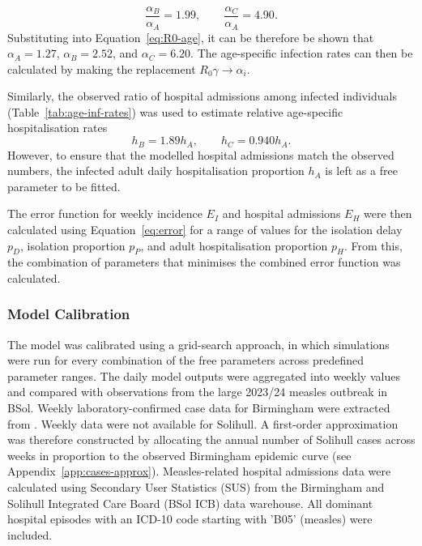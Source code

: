 \documentclass[12pt]{article}
\begin{document}
\begin{equation}
    \label{eq:inf-rates}
    \frac{\alpha_B}{\alpha_A} = 1.99,
    \qquad 
    \frac{\alpha_C}{\alpha_A} = 4.90.
\end{equation}
%
Substituting into Equation~\ref{eq:R0-age}, it can be therefore be shown that $\alpha_A = 1.27$, $\alpha_B = 2.52$, and $\alpha_C = 6.20$. The age-specific infection rates can then be calculated by making the replacement $R_0 \gamma \rightarrow \alpha_i$.

Similarly, the observed ratio of hospital admissions among infected individuals (Table~\ref{tab:age-inf-rates}) was used to estimate relative age-specific hospitalisation rates
%
\begin{equation}
    \label{eq:hosp-rates}
    h_B = 1.89 h_A,
    \qquad 
    h_C = 0.940h_A.
\end{equation}
%
However, to ensure that the modelled hospital admissions match the observed numbers, the infected adult daily hospitalisation proportion $h_A$ is left as a free parameter to be fitted.

The error function for weekly incidence $E_I$ and hospital admissions $E_H$ were then calculated using Equation~\ref{eq:error} for a range of values for the isolation delay $p_D$, isolation proportion $p_P$, and adult hospitalisation proportion $p_H$. From this, the combination of parameters that minimises the combined error function was calculated.

\subsubsection{Model Calibration}
\label{sec:tuning}

The model was calibrated using a grid-search approach, in which simulations were run for every combination of the free parameters across predefined parameter ranges. The daily model outputs were aggregated into weekly values and compared with observations from the large 2023/24 measles outbreak in BSol. Weekly laboratory-confirmed case data for Birmingham were extracted from \citeauthor{jary2025sociodemographic} \cite{jary2025sociodemographic}. Weekly data were not available for Solihull. A first-order approximation was therefore constructed by allocating the annual number of Solihull cases across weeks in proportion to the observed Birmingham epidemic curve (see Appendix~\ref{app:cases-approx}). Measles-related hospital admissions data were calculated using Secondary User Statistics (SUS) from the Birmingham and Solihull Integrated Care Board (BSol ICB) data warehouse. All dominant hospital episodes with an ICD-10 code starting with 'B05' (measles) were included. 
\end{document}
